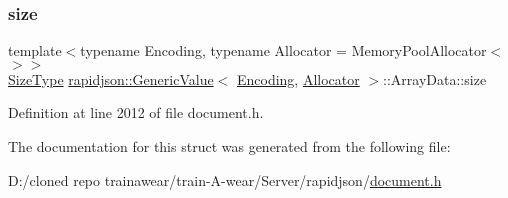 \subsubsection{\texorpdfstring{size}{size}}
{\footnotesize\ttfamily template$<$typename Encoding, typename Allocator = Memory\+Pool\+Allocator$<$$>$$>$ \\
\mbox{\hyperlink{namespacerapidjson_a44eb33eaa523e36d466b1ced64b85c84}{Size\+Type}} \mbox{\hyperlink{classrapidjson_1_1_generic_value}{rapidjson\+::\+Generic\+Value}}$<$ \mbox{\hyperlink{classrapidjson_1_1_encoding}{Encoding}}, \mbox{\hyperlink{classrapidjson_1_1_allocator}{Allocator}} $>$\+::Array\+Data\+::size}



Definition at line 2012 of file document.\+h.



The documentation for this struct was generated from the following file\+:\begin{DoxyCompactItemize}
\item 
D\+:/cloned repo trainawear/train-\/\+A-\/wear/\+Server/rapidjson/\mbox{\hyperlink{document_8h}{document.\+h}}\end{DoxyCompactItemize}
